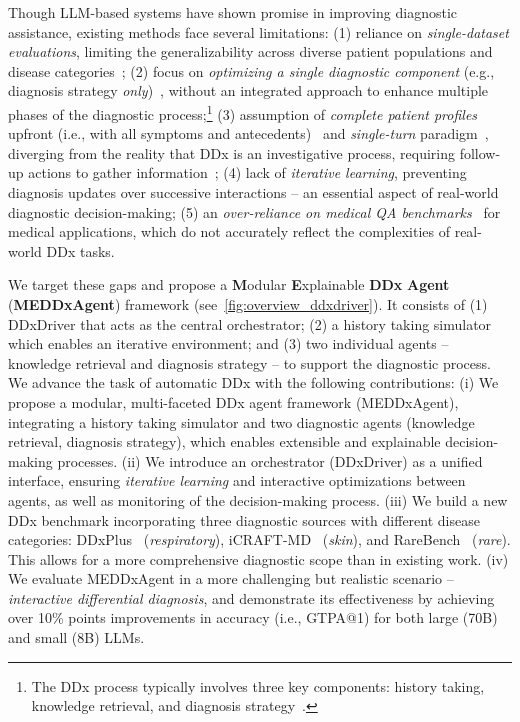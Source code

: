 Though LLM-based systems have shown promise in improving diagnostic assistance, existing methods face several limitations: (1) reliance on \textit{single-dataset evaluations}, limiting the generalizability across diverse patient populations and disease categories~\citep{alam2023ddxt}; (2) focus on \textit{optimizing a single diagnostic component} (e.g., diagnosis strategy \textit{only})~\citep{ mcduff2023towards}, without an integrated approach to enhance multiple phases of the diagnostic process;\footnote{The DDx process typically involves three key components: history taking, knowledge retrieval, and diagnosis strategy~\citep{cook2020higher, 2024PrinciplesOD}.} (3) assumption of \textit{complete patient profiles} upfront (i.e., with all symptoms and antecedents)~\citep{wu2024streambench} and \textit{single-turn} paradigm~\citep{zelin2024rare}, diverging from the reality that DDx is an investigative process, requiring follow-up actions to gather information~\citep{li2024mediq}; 
(4) lack of \textit{iterative learning}, preventing diagnosis updates over successive interactions -- an essential aspect of real-world diagnostic decision-making; (5) an \textit{over-reliance on medical QA benchmarks}~\citep{zhang2024ultramedical} for medical applications, which do not accurately reflect the complexities of real-world DDx tasks.  

We target these gaps and propose a \textbf{M}odular \textbf{E}xplainable \textbf{DDx} \textbf{Agent} (\textbf{MEDDxAgent}) framework (see~\autoref{fig:overview_ddxdriver}). It consists of (1) DDxDriver that acts as the central orchestrator; (2) a history taking simulator which enables an iterative environment; and (3) two individual agents -- knowledge retrieval and diagnosis strategy -- to support the diagnostic process. 
We advance the task of automatic DDx with the following contributions: 
(i) We propose a modular, multi-faceted DDx agent framework (MEDDxAgent), integrating a history taking simulator and two diagnostic agents (knowledge retrieval, diagnosis strategy), which enables extensible and explainable decision-making processes.
(ii) We introduce an orchestrator (DDxDriver) as a unified interface, ensuring \textit{iterative learning} and interactive optimizations between agents, as well as monitoring of the decision-making process. 
(iii) We build a new DDx benchmark incorporating three diagnostic sources with different disease categories: DDxPlus~\citep{fansi2022ddxplus} (\textit{respiratory}), iCRAFT-MD~\citep{li2024mediq} (\textit{skin}), and RareBench~\citep{chen2024rarebench} (\textit{rare}). This allows for a more comprehensive diagnostic scope than in existing work. 
(iv) We evaluate MEDDxAgent in a more challenging but realistic scenario -- \textit{interactive differential diagnosis}, and demonstrate its effectiveness by achieving over 10\% points improvements in accuracy (i.e., GTPA@1) for both large (70B) and small (8B) LLMs.  
\vspace{-0.5em}

